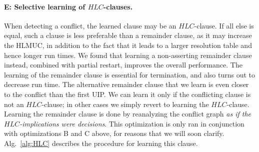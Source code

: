 \documentclass[twoside,11pt]{article}
\begin{document}
\paragraph{E: Selective learning of $HLC$-clauses.}
When detecting a conflict, the learned clause may be an $HLC$-clause. If all
else is equal, such a clause is less preferable than a remainder clause, as
it may increase the HLMUC, in addition to the fact that it leads to a larger
resolution table and hence longer run times. We found that learning a
non-asserting remainder clause instead, combined with partial restart,
improves the overall performance. The learning of the remainder clause is
essential for termination, and also turns out to decrease run time. The
alternative remainder clause that we learn is even closer to the conflict
than the first UIP. We can learn it only if the conflicting clause is not an
$HLC$-clause; in other cases we simply revert to learning the $HLC$-clause.
Learning the remainder clause is done by reanalyzing the conflict graph
\emph{as if the $HLC$-implications were decisions}. This optimization is only
ran in conjunction with optimizations  B  and  C  above, for reasons
that we will soon clarify. Alg.~\ref{alg:HLC} describes the procedure for
learning this clause.
\end{document}
